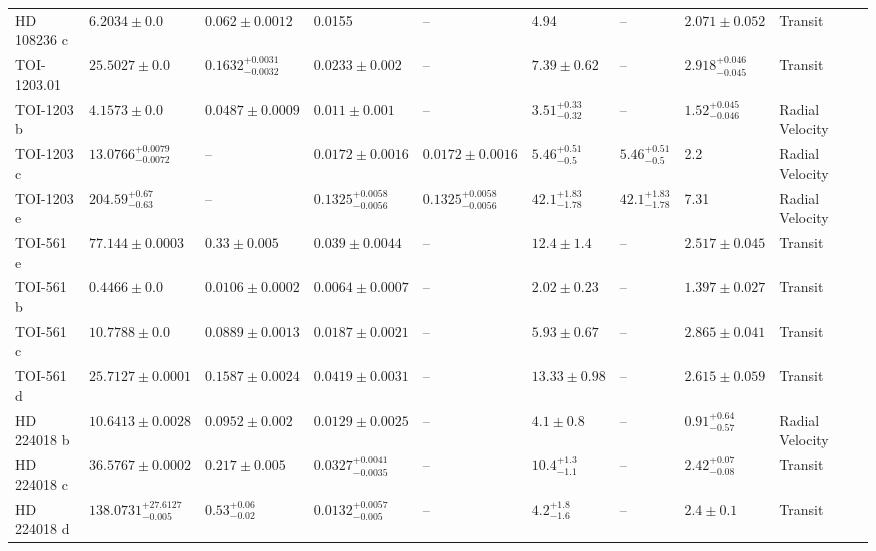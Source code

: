 \begin{tabular}{llllllllll}
HD 108236 c & $6.2034 \pm 0.0$ & $0.062 \pm 0.0012$ & 0.0155 & -- & 4.94 & -- & $2.071 \pm 0.052$ & Transit & \cite{BONFANTI_ET_AL__2021} \\
TOI-1203.01 & $25.5027 \pm 0.0$ & $0.1632^{+0.0031}_{-0.0032}$ & $0.0233 \pm 0.002$ & -- & $7.39 \pm 0.62$ & -- & $2.918^{+0.046}_{-0.045}$ & Transit & \cite{GANDOLFI_ET_AL__2025} \\
TOI-1203 b & $4.1573 \pm 0.0$ & $0.0487 \pm 0.0009$ & $0.011 \pm 0.001$ & -- & $3.51^{+0.33}_{-0.32}$ & -- & $1.52^{+0.045}_{-0.046}$ & Radial Velocity & \cite{GANDOLFI_ET_AL__2025} \\
TOI-1203 c & $13.0766^{+0.0079}_{-0.0072}$ & -- & $0.0172 \pm 0.0016$ & $0.0172 \pm 0.0016$ & $5.46^{+0.51}_{-0.5}$ & $5.46^{+0.51}_{-0.5}$ & 2.2 & Radial Velocity & \cite{GANDOLFI_ET_AL__2025} \\
TOI-1203 e & $204.59^{+0.67}_{-0.63}$ & -- & $0.1325^{+0.0058}_{-0.0056}$ & $0.1325^{+0.0058}_{-0.0056}$ & $42.1^{+1.83}_{-1.78}$ & $42.1^{+1.83}_{-1.78}$ & 7.31 & Radial Velocity & \cite{GANDOLFI_ET_AL__2025} \\
TOI-561 e & $77.144 \pm 0.0003$ & $0.33 \pm 0.005$ & $0.039 \pm 0.0044$ & -- & $12.4 \pm 1.4$ & -- & $2.517 \pm 0.045$ & Transit & \cite{PIOTTO_ET_AL__2024} \\
TOI-561 b & $0.4466 \pm 0.0$ & $0.0106 \pm 0.0002$ & $0.0064 \pm 0.0007$ & -- & $2.02 \pm 0.23$ & -- & $1.397 \pm 0.027$ & Transit & \cite{PIOTTO_ET_AL__2024} \\
TOI-561 c & $10.7788 \pm 0.0$ & $0.0889 \pm 0.0013$ & $0.0187 \pm 0.0021$ & -- & $5.93 \pm 0.67$ & -- & $2.865 \pm 0.041$ & Transit & \cite{PIOTTO_ET_AL__2024} \\
TOI-561 d & $25.7127 \pm 0.0001$ & $0.1587 \pm 0.0024$ & $0.0419 \pm 0.0031$ & -- & $13.33 \pm 0.98$ & -- & $2.615 \pm 0.059$ & Transit & \cite{PIOTTO_ET_AL__2024} \\
HD 224018 b & $10.6413 \pm 0.0028$ & $0.0952 \pm 0.002$ & $0.0129 \pm 0.0025$ & -- & $4.1 \pm 0.8$ & -- & $0.91^{+0.64}_{-0.57}$ & Radial Velocity & \cite{DAMASSO_ET_AL_2025} \\
HD 224018 c & $36.5767 \pm 0.0002$ & $0.217 \pm 0.005$ & $0.0327^{+0.0041}_{-0.0035}$ & -- & $10.4^{+1.3}_{-1.1}$ & -- & $2.42^{+0.07}_{-0.08}$ & Transit & \cite{DAMASSO_ET_AL_2025} \\
HD 224018 d & $138.0731^{+27.6127}_{-0.005}$ & $0.53^{+0.06}_{-0.02}$ & $0.0132^{+0.0057}_{-0.005}$ & -- & $4.2^{+1.8}_{-1.6}$ & -- & $2.4 \pm 0.1$ & Transit & \cite{DAMASSO_ET_AL_2025} \\

\end{tabular}
